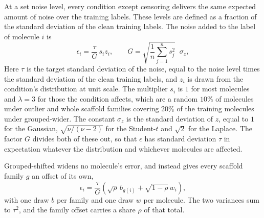 At a set noise level, every condition except censoring delivers the same expected amount of noise over the training labels. These levels are defined as a fraction of the standard deviation of the clean training labels. The noise added to the label of molecule $i$ is
\begin{equation}
\epsilon_i = \frac{\tau}{G}\,s_i z_i,
\qquad
G = \sqrt{\frac{1}{n}\sum_{j=1}^{n} s_j^{2}}\;\;\sigma_z,
\label{eq:dose_matching}
\end{equation}
Here $\tau$ is the target standard deviation of the noise, equal to the noise level times the standard deviation of the clean training labels, and $z_i$ is
drawn from the condition's distribution at unit scale. The multiplier $s_i$ is $1$ for most
molecules and $\lambda = 3$ for those the condition affects, which are a random $10\%$ of molecules
under outlier and whole scaffold families covering $20\%$ of the training molecules under grouped-wider. The
constant $\sigma_z$ is the standard deviation of $z$, equal to $1$ for the Gaussian,
$\sqrt{\nu/(\nu-2)}$ for the Student-$t$ and $\sqrt{2}$ for the Laplace. The factor $G$ divides both
of these out, so that $\epsilon$ has standard deviation $\tau$ in expectation whatever the
distribution and whichever molecules are affected.

Grouped-shifted widens no molecule's error, and instead gives every scaffold family $g$ an offset of
its own,
\begin{equation}
\epsilon_i = \frac{\tau}{G}\left(\sqrt{\rho}\,b_{g(i)} + \sqrt{1-\rho}\,w_i\right),
\label{eq:grouped_shifted}
\end{equation}
with one draw $b$ per family and one draw $w$ per molecule. The two variances sum to $\tau^{2}$, and
the family offset carries a share $\rho$ of that total.


